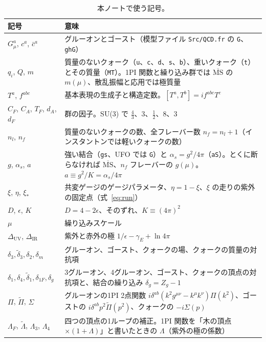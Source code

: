 \documentclass[a4paper,10pt]{ltjsarticle}
\newcommand{\MSbar}{\overline{\mathrm{MS}}}
\newcommand{\DUV}{\Delta_{\mathrm{UV}}}
\newcommand{\DIR}{\Delta_{\mathrm{IR}}}
\begin{document}
\begin{table}[tbp]
\centering\small
\caption{本ノートで使う記号。}
\label{tab:notation}
\begin{tabularx}{\linewidth}{>{\raggedright\arraybackslash}p{3.9cm}X}
\toprule
\textbf{記号} & \textbf{意味} \\
\midrule
$G^a_\mu$, $c^a$, $\bar c^a$ & グルーオンとゴースト（模型ファイル \texttt{Src/QCD.fr} の \texttt{G}、\texttt{ghG}） \\
$q_i$, $Q$, $m$ & 質量のないクォーク（\texttt{u}、\texttt{c}、\texttt{d}、\texttt{s}、\texttt{b}）、重いクォーク（\texttt{t}）とその質量（\texttt{MT}）。1PI 関数と繰り込み群では $\MSbar$ の $m(\mu)$、散乱振幅と応用では極質量 \\
$T^a$, $f^{abc}$ & 基本表現の生成子と構造定数。$[T^a,T^b]=if^{abc}T^c$ \\
$C_F$, $C_A$, $T_F$, $d_A$, $d_F$ & 群の因子。SU(3) で $\frac43$、$3$、$\frac12$、$8$、$3$ \\
$n_l$, $n_f$ & 質量のないクォークの数、全フレーバー数 $n_f=n_l+1$（インスタントンでは軽いクォークの数） \\
$g$, $\alpha_s$, $a$ & 強い結合（\texttt{gs}、UFO では \texttt{G}）と $\alpha_s=g^2/4\pi$（\texttt{aS}）。とくに断らなければ $\MSbar$、$n_f$ フレーバーの $g(\mu)$。$a\equiv g^2/K=\alpha_s/4\pi$ \\
$\xi$, $\eta$, $\xi_*$ & 共変ゲージのゲージパラメータ、$\eta=1-\xi$、$\xi$ の走りの紫外の固定点（式~\eqref{eq:run}） \\
$D$, $\epsilon$, $K$ & $D=4-2\epsilon$、そのずれ、$K\equiv(4\pi)^2$ \\
$\mu$ & 繰り込みスケール \\
$\DUV$, $\DIR$ & 紫外と赤外の極 $1/\epsilon-\gamma_E+\ln4\pi$ \\
$\delta_3,\tilde\delta_3,\delta_2,\delta_m$ & グルーオン、ゴースト、クォークの場、クォークの質量の対抗項 \\
$\delta_1,\delta_4,\tilde\delta_1,\delta_{1F},\delta_g$ & 3グルーオン、4グルーオン、ゴースト、クォークの頂点の対抗項と、結合の繰り込み $\delta_g=Z_g-1$ \\
$\Pi$, $\tilde\Pi$, $\Sigma$ & グルーオンの1PI 2点関数 $i\delta^{ab}(k^2g^{\mu\nu}-k^\mu k^\nu)\Pi(k^2)$、ゴーストの $i\delta^{ab}p^2\tilde\Pi(p^2)$、クォークの $-i\Sigma(p)$ \\
$\Lambda_F$, $\tilde\Lambda$, $\Lambda_3$, $\Lambda_4$ & 四つの頂点の1ループの補正。1PI 関数を「木の頂点 $\times(1+\Lambda)$」と書いたときの $\Lambda$（紫外の極の係数） \\

\end{tabularx}
\end{table}
\end{document}
